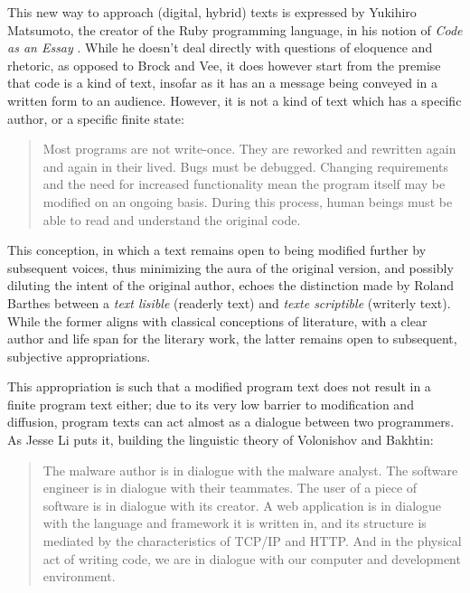 This new way to approach (digital, hybrid) texts is expressed by Yukihiro Matsumoto, the creator of the Ruby programming language, in his notion of \emph{Code as an Essay} \citep{oram_beautiful_2007}. While he doesn't deal directly with questions of eloquence and rhetoric, as opposed to Brock and Vee, it does however start from the premise that code is a kind of text, insofar as it has an a message being conveyed in a written form to an audience. However, it is not a kind of text which has a specific author, or a specific finite state:

\begin{quote}
  Most programs are not write-once. They are reworked and rewritten again and again in their lived. Bugs must be debugged. Changing requirements and the need for increased functionality mean the program itself may be modified on an ongoing basis. During this process, human beings must be able to read and understand the original code.
\end{quote}

This conception, in which a text remains open to being modified further by subsequent voices, thus minimizing the aura of the original version, and possibly diluting the intent of the original author, echoes the distinction made by Roland Barthes between a \emph{text lisible} (readerly text) and \emph{texte scriptible} (writerly text). While the former aligns with classical conceptions of literature, with a clear author and life span for the literary work, the latter remains open to subsequent, subjective appropriations.

This appropriation is such that a modified program text does not result in a finite program text either; due to its very low barrier to modification and diffusion, program texts can act almost as a dialogue between two programmers. As Jesse Li puts it, building the linguistic theory of Volonishov and Bakhtin:

\begin{quote}
  The malware author is in dialogue with the malware analyst. The software engineer is in dialogue with their teammates. The user of a piece of software is in dialogue with its creator. A web application is in dialogue with the language and framework it is written in, and its structure is mediated by the characteristics of TCP/IP and HTTP. And in the physical act of writing code, we are in dialogue with our computer and development environment. \citep{li_where_2020}
\end{quote}

